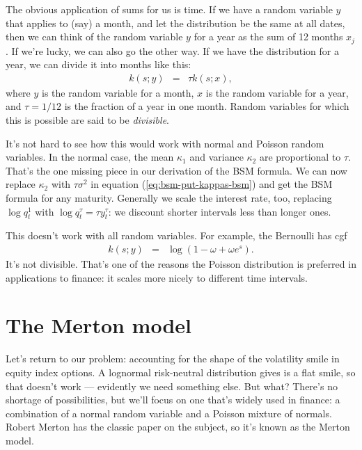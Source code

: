 \documentclass[11pt]{article}
\begin{document}
The obvious application of sums for us is time.
If we have a random variable $y$ that applies to (say) a month,
and let the distribution be the same at all dates,
then we can think of  the random variable $y$ for a year
as the sum of 12 months $x_j$.
If we're lucky, we can also go the other way.
If we have the distribution for a year, we can divide it
into months like this:
\begin{eqnarray*}
    k(s; y) &=&  \tau k(s; x) ,
\end{eqnarray*}
where $y$ is the random variable for a month,
$x$ is the random variable for a year,
and $\tau = 1/12$ is the fraction of a year in one month.
Random variables for which this is possible are said to be {\it divisible\/}.

It's not hard to see how this would work with normal
and Poisson random variables.
In the normal case, the mean $\kappa_1$ and variance $\kappa_2$
are proportional to $\tau$.
That's the one missing piece in our derivation of the BSM formula.
We can now replace $\kappa_2$ with $\tau \sigma^2$
in equation (\ref{eq:bsm-put-kappas-bsm})
and get the BSM formula for any maturity.
Generally we scale the interest rate, too, replacing $ \log q^1_t$
with $\log q^\tau_t = \tau y^\tau_t $:  we discount shorter
intervals less than longer ones.

This doesn't work with all random variables.
For example, the Bernoulli has cgf
\begin{eqnarray*}
    k(s; y) &=& \log \left( 1-\omega + \omega e^s \right) .
\end{eqnarray*}
It's not divisible.
That's one of the reasons the Poisson distribution is preferred in applications
to finance:  it scales more nicely to different time intervals.


\section{The Merton model}
\label{sec:merton}

Let's return to our problem:  accounting for the
shape of the volatility smile in equity index options.
A lognormal risk-neutral distribution gives is a flat smile,
so that doesn't work ---
evidently we need something else.
But what?
There's no shortage of possibilities, but we'll focus on one that's widely used in finance:
a combination of a normal random variable and a Poisson mixture of normals.
Robert Merton has the classic paper on the subject,
so it's known as the Merton model.
\end{document}
